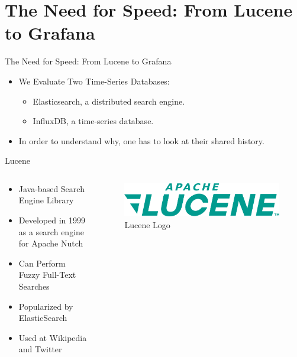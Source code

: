 \documentclass[compress,aspectratio=169]{beamer}
\begin{document}
\section[Overview]{The Need for Speed: From Lucene to Grafana}
\begin{frame}{The Need for Speed: From Lucene to Grafana}
  \begin{itemize}
    \item We Evaluate Two Time-Series Databases:
    \begin{itemize}
      \item Elasticsearch, a distributed search engine.
      \item InfluxDB, a time-series database.
    \end{itemize}
  \item In order to understand why, one has to look at their shared history.
  \end{itemize}
\end{frame}

\begin{frame}{Lucene}
\begin{columns}[T]
\begin{column}{0.5\textwidth}
\begin{itemize}
  \item Java-based Search Engine Library
  \item Developed in 1999 as a search engine for Apache Nutch
  \item Can Perform Fuzzy Full-Text Searches
  \item Popularized by ElasticSearch
  \item Used at Wikipedia and Twitter
\end{itemize}
\end{column}
\begin{column}{0.5\textwidth}
\begin{figure}
  \includegraphics[width=\textwidth]{lucene.png}
  \caption{Lucene Logo}
\end{figure}
\end{column}
\end{columns}
\end{frame}
\end{document}
